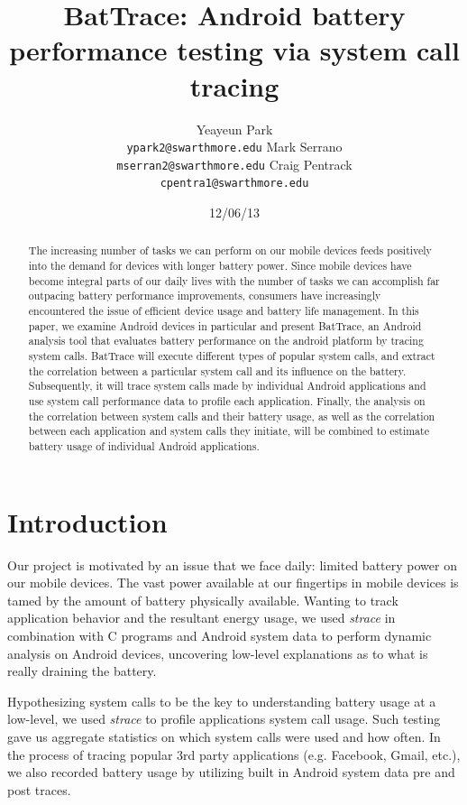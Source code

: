 \documentclass[11pt]{article}
\title{BatTrace: Android battery performance testing via system call tracing}
\author{Yeayeun Park\\
{\tt ypark2@swarthmore.edu}
\And 
Mark Serrano\\
{\tt mserran2@swarthmore.edu}
\AND
Craig Pentrack\\                 
{\tt cpentra1@swarthmore.edu}}
\date{12/06/13}
\begin{document}
\maketitle
\begin{abstract}
  The increasing number of tasks we can perform on our mobile devices 
  feeds positively into the demand for devices with longer battery power. 
  Since mobile devices have become integral parts of our daily lives with
  the number of tasks we can accomplish far outpacing battery performance 
  improvements, consumers have increasingly encountered the issue of 
  efficient device usage and battery life management. In this paper, we 
  examine Android devices in particular and present BatTrace, an Android 
  analysis tool that evaluates battery performance on the android platform
  by tracing system calls. BatTrace will execute different types of popular system
  calls, and extract the correlation between a particular system call and its 
  influence on the battery. Subsequently, it will trace system calls made by 
  individual Android applications and use system call performance data to profile
  each application. Finally, the analysis on the correlation between system calls and their 
  battery usage, as well as the correlation between each application and system 
  calls they initiate, will be combined to estimate battery usage 
  of individual Android applications.
\end{abstract}

\section{Introduction}
Our project is motivated by an issue that we face daily: limited battery power 
on our mobile devices. The vast power available at our fingertips in mobile
devices is tamed by the amount of battery physically available. Wanting to track application behavior 
and the resultant energy usage, we used \textit{strace} in combination with C programs and Android system data to perform 
dynamic analysis on Android devices, uncovering low-level explanations as to what is really 
draining the battery.

Hypothesizing system calls to be the key to understanding battery usage at a low-level, we 
used \textit{strace} to profile applications system call usage.  Such testing gave us aggregate
statistics on which system calls were used and how often.  In the process of tracing popular
3rd party applications (e.g. Facebook, Gmail, etc.), we also recorded battery usage by utilizing
built in Android system data pre and post traces.  
\end{document}
